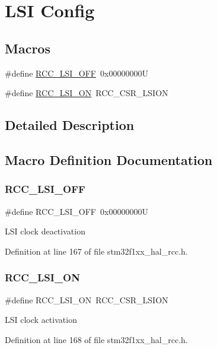 \hypertarget{group___r_c_c___l_s_i___config}{}\section{L\+SI Config}
\label{group___r_c_c___l_s_i___config}
\subsection*{Macros}
\begin{DoxyCompactItemize}
\item 
\#define \hyperlink{group___r_c_c___l_s_i___config_gaa1710927d79a2032f87f039c4a27356a}{R\+C\+C\+\_\+\+L\+S\+I\+\_\+\+O\+FF}~0x00000000U
\item 
\#define \hyperlink{group___r_c_c___l_s_i___config_ga6b364ac3500e60b6bff695ee518c87d6}{R\+C\+C\+\_\+\+L\+S\+I\+\_\+\+ON}~R\+C\+C\+\_\+\+C\+S\+R\+\_\+\+L\+S\+I\+ON
\end{DoxyCompactItemize}


\subsection{Detailed Description}


\subsection{Macro Definition Documentation}
\mbox{\label{group___r_c_c___l_s_i___config_gaa1710927d79a2032f87f039c4a27356a}} 
\subsubsection{\texorpdfstring{R\+C\+C\+\_\+\+L\+S\+I\+\_\+\+O\+FF}{RCC\_LSI\_OFF}}
{\footnotesize\ttfamily \#define R\+C\+C\+\_\+\+L\+S\+I\+\_\+\+O\+FF~0x00000000U}

L\+SI clock deactivation 

Definition at line 167 of file stm32f1xx\+\_\+hal\+\_\+rcc.\+h.

\mbox{\label{group___r_c_c___l_s_i___config_ga6b364ac3500e60b6bff695ee518c87d6}} 
\subsubsection{\texorpdfstring{R\+C\+C\+\_\+\+L\+S\+I\+\_\+\+ON}{RCC\_LSI\_ON}}
{\footnotesize\ttfamily \#define R\+C\+C\+\_\+\+L\+S\+I\+\_\+\+ON~R\+C\+C\+\_\+\+C\+S\+R\+\_\+\+L\+S\+I\+ON}

L\+SI clock activation 

Definition at line 168 of file stm32f1xx\+\_\+hal\+\_\+rcc.\+h.

